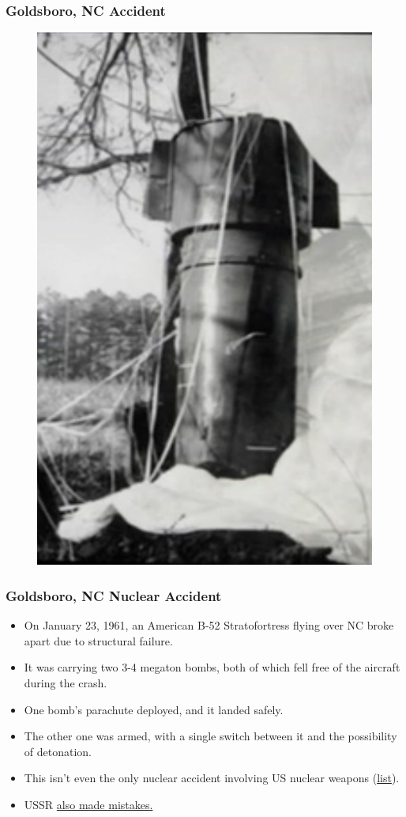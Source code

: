 \documentclass[handout]{beamer}
\begin{document}
\begin{frame} 
	\frametitle{\LARGE{Goldsboro, NC Accident}}
	\begin{figure}
		\includegraphics[height=.85\textheight,keepaspectratio]{./goldsboro.jpg}
	\end{figure}
\end{frame}

\begin{frame} 
\frametitle{\LARGE{Goldsboro, NC Nuclear Accident}}
\begin{itemize}
	\item On January 23, 1961, an American B-52 Stratofortress flying over NC broke apart due to structural failure. \pause
	\item It was carrying two 3-4 megaton bombs, both of which fell free of the aircraft during the crash. \pause
	\item One bomb's parachute deployed, and it landed safely. \pause
	\item The other one was armed, with a single switch between it and the possibility of detonation. \pause
	\item This isn't even the only nuclear accident involving US nuclear weapons (\href{https://en.wikipedia.org/wiki/List_of_military_nuclear_accidents}{list}).
	\item USSR \href{https://en.wikipedia.org/wiki/1983_Soviet_nuclear_false_alarm_incident}{also made mistakes.}
\end{itemize}
\end{frame}
\end{document}
